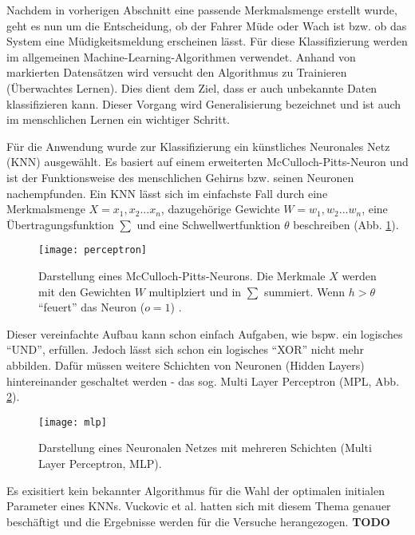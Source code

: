 \label{sec:classification}
Nachdem in vorherigen Abschnitt eine passende Merkmalsmenge erstellt wurde, geht es nun um die Entscheidung, ob der Fahrer Müde oder Wach ist bzw. ob das System eine Müdigkeitsmeldung erscheinen lässt. Für diese Klassifizierung werden im allgemeinen Machine-Learning-Algorithmen verwendet. Anhand von markierten Datensätzen wird versucht den Algorithmus zu Trainieren (Überwachtes Lernen). Dies dient dem Ziel, dass er auch unbekannte Daten klassifizieren kann. Dieser Vorgang wird Generalisierung bezeichnet und ist auch im menschlichen Lernen ein wichtiger Schritt.

Für die Anwendung wurde zur Klassifizierung ein künstliches Neuronales Netz (KNN) ausgewählt. Es basiert auf einem erweiterten McCulloch-Pitts-Neuron \cite{ann} und ist der Funktionsweise des menschlichen Gehirns bzw. seinen Neuronen nachempfunden\cite{marsland_opac-b1129336}. Ein KNN lässt sich im einfachste Fall durch eine Merkmalsmenge $X = x_1, x_2 ... x_n$, dazugehörige Gewichte $W = w_1, w_2 ... w_n$, eine Übertragungsfunktion $\sum$ und eine Schwellwertfunktion $\theta$ beschreiben (Abb. \ref{fig:perceptron}).

\begin{figure}[h] 
  \begin{center}
    \texttt{[image: perceptron]}
    \caption[Perceptron]{Darstellung eines McCulloch-Pitts-Neurons. Die Merkmale $X$ werden mit den Gewichten $W$ multiplziert und in $\sum$ summiert. Wenn $h > \theta$ "`feuert"' das Neuron ($o = 1$) \cite{marsland_opac-b1129336}. \label{fig:perceptron}}
  \end{center}
\end{figure}

Dieser vereinfachte Aufbau kann schon einfach Aufgaben, wie bspw. ein logisches "`UND"', erfüllen. Jedoch lässt sich schon  ein logisches "`XOR"' nicht mehr abbilden. Dafür müssen weitere Schichten von Neuronen (Hidden Layers) hintereinander geschaltet werden - das sog. Multi Layer Perceptron (MPL, Abb. \ref{fig:mlp}).

\begin{figure}[h] 
  \begin{center}
    \texttt{[image: mlp]}
    \caption[Schema eines Multi-Layer-Perceptron]{Darstellung eines Neuronalen Netzes mit mehreren Schichten (Multi Layer Perceptron, MLP)\cite{marsland_opac-b1129336}. \label{fig:mlp}}
  \end{center}
\end{figure}

Es exisitiert kein bekannter Algorithmus für die Wahl der optimalen initialen Parameter eines KNNs. Vuckovic et al. \cite{Vuckovic2002349} hatten sich mit diesem Thema genauer beschäftigt und die Ergebnisse werden für die Versuche herangezogen.
\textbf{TODO}